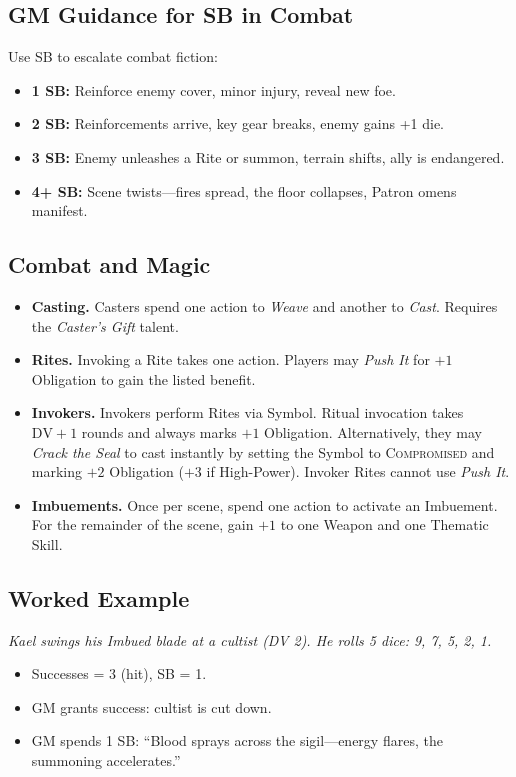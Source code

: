 \subsection{GM Guidance for SB in Combat}
Use SB to escalate combat fiction:
\begin{itemize}
  \item \textbf{1 SB:} Reinforce enemy cover, minor injury, reveal new foe.
  \item \textbf{2 SB:} Reinforcements arrive, key gear breaks, enemy gains +1 die.
  \item \textbf{3 SB:} Enemy unleashes a Rite or summon, terrain shifts, ally is endangered.
  \item \textbf{4+ SB:} Scene twists—fires spread, the floor collapses, Patron omens manifest.
\end{itemize}

\subsection{Combat and Magic}
\begin{itemize}
  \item \textbf{Casting.} Casters spend one action to \emph{Weave} and another to \emph{Cast}. Requires the \emph{Caster’s Gift} talent. 
  \item \textbf{Rites.} Invoking a Rite takes one action. Players may \emph{Push It} for $+1$ Obligation to gain the listed benefit. 
  \item \textbf{Invokers.} Invokers perform Rites via Symbol. Ritual invocation takes $\text{DV}+1$ rounds and always marks $+1$ Obligation. Alternatively, they may \emph{Crack the Seal} to cast instantly by setting the Symbol to \textsc{Compromised} and marking $+2$ Obligation ($+3$ if High-Power). Invoker Rites cannot use \emph{Push It}. 
  \item \textbf{Imbuements.} Once per scene, spend one action to activate an Imbuement. For the remainder of the scene, gain $+1$ to one Weapon and one Thematic Skill. 
\end{itemize}

\subsection{Worked Example}
\emph{Kael swings his Imbued blade at a cultist (DV 2). He rolls 5 dice: 9, 7, 5, 2, 1.}
\begin{itemize}
  \item Successes = 3 (hit), SB = 1.
  \item GM grants success: cultist is cut down.
  \item GM spends 1 SB: ``Blood sprays across the sigil—energy flares, the summoning accelerates.''
\end{itemize}
